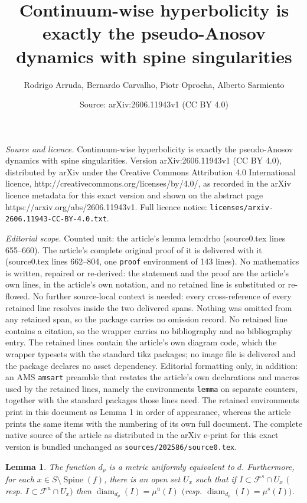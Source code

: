 \documentclass[10pt,a4paper]{amsart}
\title{Continuum-wise hyperbolicity is exactly the pseudo-Anosov dynamics with spine singularities}
\author{Rodrigo Arruda, Bernardo Carvalho, Piotr Oprocha, Alberto Sarmiento}
\date{Source: arXiv:2606.11943v1 (CC BY 4.0)}
\newtheorem{lemma}{Lemma}
\newcommand{\diam}{\operatorname{diam}}
\newcommand{\mc}{\mathcal}
\newcommand{\spine}{\operatorname{Spine}}
\begin{document}
\maketitle

\noindent\emph{Source and licence.} Continuum-wise hyperbolicity is exactly the pseudo-Anosov dynamics with spine singularities. Version arXiv:2606.11943v1 (CC BY 4.0), distributed by arXiv under the Creative Commons Attribution 4.0 International licence, http://creativecommons.org/licenses/by/4.0/, as recorded in the arXiv licence metadata for this exact version and shown on the abstract page https://arxiv.org/abs/2606.11943v1. Full licence notice: \texttt{licenses/arxiv-2606.11943-CC-BY-4.0.txt}.\par\smallskip

\noindent\textit{Editorial scope.} Counted unit: the article's lemma lem:drho (source0.tex lines 655--660). The article's complete original proof of it is delivered with it (source0.tex lines 662--804, one \texttt{proof} environment of 143 lines). No mathematics is written, repaired or re-derived: the statement and the proof are the article's own lines, in the article's own notation, and no retained line is substituted or re-flowed.  No further source-local context is needed: every cross-reference of every retained line resolves inside the two delivered spans.  Nothing was omitted from any retained span, so the package carries no omission record.  No retained line contains a citation, so the wrapper carries no bibliography and no bibliography entry.  The retained lines contain the article's own diagram code, which the wrapper typesets with the standard tikz packages; no image file is delivered and the package declares no asset dependency.  Editorial formatting only, in addition: an AMS \texttt{amsart} preamble that restates the article's own declarations and macros used by the retained lines, namely the environments \texttt{lemma} on separate counters, together with the standard packages those lines need.  The retained environments print in this document as Lemma 1 in order of appearance, whereas the article prints the same items with the numbering of its own full document.  The complete native source of the article as distributed in the arXiv e-print for this exact version is bundled unchanged as \texttt{sources/202586/source0.tex}.
\begin{lemma}\label{lem:drho}
The function $d_\rho$ is a metric uniformly equivalent to $d$. 
Furthermore, for each $x\in S\setminus \spine(f)$, there is an open set $U_x$ such that if
$I\subset \mc{F}^s\cap U_x$ $($resp. $I\subset \mc{F}^u\cap U_x)$ 
then $\diam_{d_\rho}(I)= \mu^u(I)$ $($resp. $\diam_{d_\rho}(I)=\mu^s(I))$.
\end{lemma}
\end{document}
